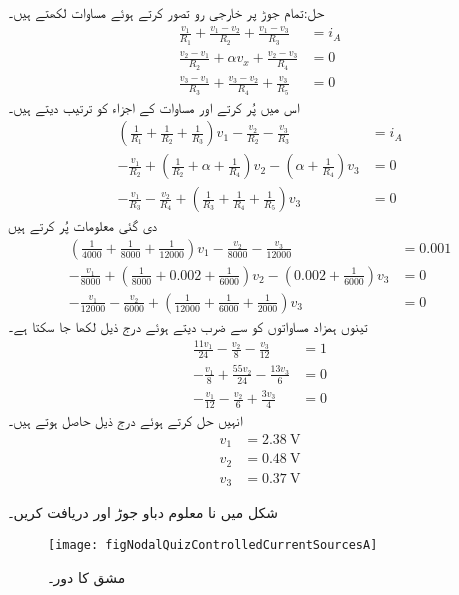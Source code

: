 حل:تمام جوڑ پر خارجی رو تصور کرتے ہوئے مساوات لکھتے ہیں۔
\begin{align*}
\frac{v_1}{R_1}+\frac{v_1-v_2}{R_2}+\frac{v_1-v_3}{R_3}&=i_A\\
\frac{v_2-v_1}{R_2}+\alpha v_x +\frac{v_2-v_3}{R_4}&=0\\
\frac{v_3-v_1}{R_3}+\frac{v_3-v_2}{R_4}+\frac{v_3}{R_5}&=0
\end{align*}
اس میں  پُر کرتے اور مساوات کے اجزاء کو ترتیب دیتے ہیں۔
\begin{align*}
\left(\frac{1}{R_1}+\frac{1}{R_2}+\frac{1}{R_3}\right)v_1-\frac{v_2}{R_2}-\frac{v_3}{R_3}&=i_A\\
-\frac{v_1}{R_2}+\left(\frac{1}{R_2}+\alpha+\frac{1}{R_4}\right)v_2-(\alpha+\frac{1}{R_4})v_3&=0\\
-\frac{v_1}{R_3}-\frac{v_2}{R_4}+\left(\frac{1}{R_3}+\frac{1}{R_4}+\frac{1}{R_5}\right)v_3&=0
\end{align*}
دی گئی معلومات پُر کرتے ہیں
\begin{align*}
\left(\frac{1}{4000}+\frac{1}{8000}+\frac{1}{12000}\right)v_1-\frac{v_2}{8000}-\frac{v_3}{12000}&=0.001\\
-\frac{v_1}{8000}+\left(\frac{1}{8000}+0.002+\frac{1}{6000}\right)v_2-(0.002+\frac{1}{6000})v_3&=0\\
-\frac{v_1}{12000}-\frac{v_2}{6000}+\left(\frac{1}{12000}+\frac{1}{6000}+\frac{1}{2000}\right)v_3&=0
\end{align*}
تینوں ہمزاد مساواتوں کو  سے ضرب دیتے ہوئے درج ذیل لکھا جا سکتا ہے۔
\begin{align*}
\frac{11v_1}{24}-\frac{v_2}{8}-\frac{v_3}{12}&=1\\
-\frac{v_1}{8}+\frac{55 v_2}{24}-\frac{13 v_3}{6}&=0\\
-\frac{v_1}{12}-\frac{v_2}{6}+\frac{3v_3}{4}&=0
\end{align*}
انہیں حل کرتے ہوئے درج ذیل حاصل ہوتے ہیں۔
\begin{align*}
v_1&=\SI{2.38}{\volt}\\
v_2&=\SI{0.48}{\volt}\\
v_3&=\SI{0.37}{\volt}
\end{align*}
\FloatBarrier

شکل  میں نا معلوم دباو جوڑ  اور  دریافت کریں۔ 
\begin{figure}
\centering
\texttt{[image: figNodalQuizControlledCurrentSourcesA]}
\caption{مشق  کا دور۔}
\label{شکل_مشق_جوڑ_تابع_منبع_رو_الف}
\end{figure}%

